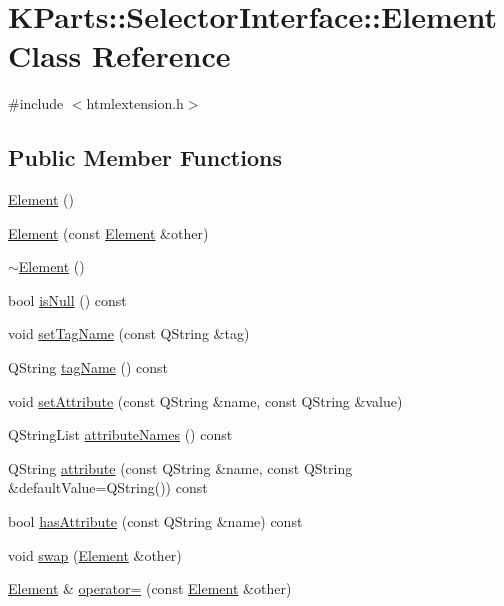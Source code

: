 \hypertarget{classKParts_1_1SelectorInterface_1_1Element}{\section{K\+Parts\+:\+:Selector\+Interface\+:\+:Element Class Reference}
\label{classKParts_1_1SelectorInterface_1_1Element}
}


{\ttfamily \#include $<$htmlextension.\+h$>$}

\subsection*{Public Member Functions}
\begin{DoxyCompactItemize}
\item 
\hyperlink{classKParts_1_1SelectorInterface_1_1Element_a3438a3a6610070f3f38a93f3794565f7}{Element} ()
\item 
\hyperlink{classKParts_1_1SelectorInterface_1_1Element_a68e01b9d6df45aa0847abe82d84d57e2}{Element} (const \hyperlink{classKParts_1_1SelectorInterface_1_1Element}{Element} \&other)
\item 
\hyperlink{classKParts_1_1SelectorInterface_1_1Element_a2217b551a1f1b1178caa8f9cfb2dd450}{$\sim$\+Element} ()
\item 
bool \hyperlink{classKParts_1_1SelectorInterface_1_1Element_a6d39d0c6e81f1ad38c65eb98f2a7f5f2}{is\+Null} () const 
\item 
void \hyperlink{classKParts_1_1SelectorInterface_1_1Element_a86933031ca5490842cb836fbc8d3e5ed}{set\+Tag\+Name} (const Q\+String \&tag)
\item 
Q\+String \hyperlink{classKParts_1_1SelectorInterface_1_1Element_a87648c85c363b97ddf75fae2f8c78120}{tag\+Name} () const 
\item 
void \hyperlink{classKParts_1_1SelectorInterface_1_1Element_a55c2e067351500bda7fe4af303f3d441}{set\+Attribute} (const Q\+String \&name, const Q\+String \&value)
\item 
Q\+String\+List \hyperlink{classKParts_1_1SelectorInterface_1_1Element_a3e41322aa68aaeff16e49d606f29efc9}{attribute\+Names} () const 
\item 
Q\+String \hyperlink{classKParts_1_1SelectorInterface_1_1Element_a12aa65318e692c7bd967db03117fa6b0}{attribute} (const Q\+String \&name, const Q\+String \&default\+Value=Q\+String()) const 
\item 
bool \hyperlink{classKParts_1_1SelectorInterface_1_1Element_ad3682efe41b9d40511cbe3762cc5127b}{has\+Attribute} (const Q\+String \&name) const 
\item 
void \hyperlink{classKParts_1_1SelectorInterface_1_1Element_a99bd201adbe5fd238de6f12900f8b632}{swap} (\hyperlink{classKParts_1_1SelectorInterface_1_1Element}{Element} \&other)
\item 
\hyperlink{classKParts_1_1SelectorInterface_1_1Element}{Element} \& \hyperlink{classKParts_1_1SelectorInterface_1_1Element_adbc4b50003be9798d2212e3d0c998bd7}{operator=} (const \hyperlink{classKParts_1_1SelectorInterface_1_1Element}{Element} \&other)
\end{DoxyCompactItemize}


